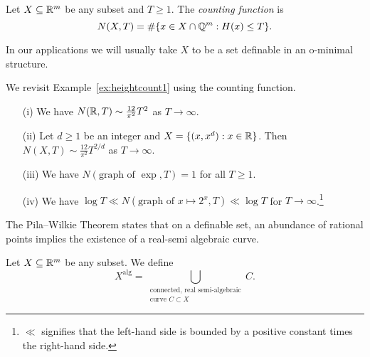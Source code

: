 \begin{definition}
  \label{def:countingfunc}
  Let $X\subseteq{\mathbb{R}}^m$ be any subset and $T\ge 1$. The \emph{counting
    function} is 
  \begin{equation*}
    N(X,T) = \#\{ x\in X\cap {\mathbb{Q}}^m : H(x)\le T\}. 
  \end{equation*}
\end{definition}

In our applications we will usually take $X$ to be a  set definable in
an o-minimal structure.

\begin{example}
  \label{ex:heightcount2}
  We revisit Example~\ref{ex:heightcount1} using the counting
  function.
  \begin{enumerate}
  \item [(i)] We have $N({\mathbb{R}},T)\sim \frac{12}{\pi^2}T^2$ as
    $T\rightarrow\infty$.
  \item [(ii)] Let $d\ge 1$ be an integer and $X= \{(x,x^d):
    x\in{\mathbb{R}}\}$. Then $N(X,T)\sim \frac{12}{\pi^2}T^{2/d}$ as
    $T\rightarrow\infty$.
  \item[(iii)] We have $N(\text{graph of }\exp,T) = 1$ for all $T\ge
    1$.
  \item [(iv)] We have $\log T \ll
    N(\text{graph of }x\mapsto 2^x,T)\ll \log T$ for $T\rightarrow\infty$.\footnote{$\ll$
      signifies that the left-hand side is bounded by a positive
      constant times the right-hand side.}
  \end{enumerate}
\end{example}

The Pila--Wilkie Theorem states that on a definable set, an abundance of
rational points implies the existence of a real-semi algebraic curve.

\begin{definition}
  Let $X\subseteq{\mathbb{R}}^m$ be any subset. We define
  \begin{equation*}
    X^{\mathrm{alg}} = \bigcup_{\substack{\text{connected, real
          semi-algebraic}\\ \text{curve }C\subset X}} C.
  \end{equation*}
\end{definition}

